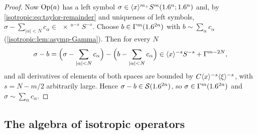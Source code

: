 \begin{proof}
Now $\operatorname{Op}(a)$ has a left symbol $\sigma\in\langle x\rangle^{m_+}S^m(1.6^n;1.6^n)$ and, by
\eqref{isotropic:eq:taylor-remainder} and uniqueness of left symbols,
$\sigma-\sum_{|\alpha|<N}c_\alpha\in\ang{x}^{-s}S^{-s}$. Choose
$b\in\Gamma^{m}(1.6^{2n})$ with $b\sim\sum_\alpha c_\alpha$
(\cref{isotropic:lem:asymp-Gamma}). Then for every $N$
\begin{equation*}
  \sigma-b=\Bigl(\sigma-\sum_{|\alpha|<N}c_\alpha\Bigr)-\Bigl(b-\sum_{|\alpha|<N}c_\alpha\Bigr)
  \in\langle x\rangle^{-s}S^{-s}+\Gamma^{m-2N},
\end{equation*}
and all derivatives of elements of both spaces are bounded by
$C\langle x\rangle^{-s}\langle \xi\rangle^{-s}$, with $s=N-m/2$ arbitrarily large. Hence
$\sigma-b\in\mathcal{S}(1.6^{2n})$, so $\sigma\in\Gamma^{m}(1.6^{2n})$ and
$\sigma\sim\sum_\alpha c_\alpha$.
\end{proof}

\subsection{The algebra of isotropic operators}

